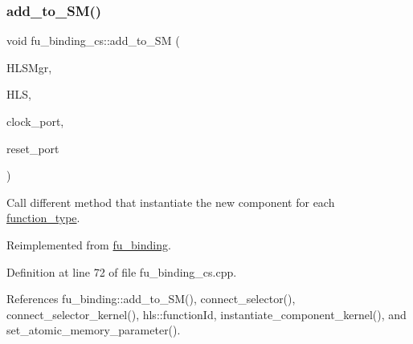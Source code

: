 \subsubsection{\texorpdfstring{add\+\_\+to\+\_\+\+S\+M()}{add\_to\_SM()}}
{\footnotesize\ttfamily void fu\+\_\+binding\+\_\+cs\+::add\+\_\+to\+\_\+\+SM (\begin{DoxyParamCaption}\item[{const \hyperlink{hls__manager_8hpp_acd3842b8589fe52c08fc0b2fcc813bfe}{H\+L\+S\+\_\+manager\+Ref}}]{H\+L\+S\+Mgr,  }\item[{const \hyperlink{hls_8hpp_a75d0c73923d0ddfa28c4843a802c73a7}{hls\+Ref}}]{H\+LS,  }\item[{\hyperlink{structural__objects_8hpp_a8ea5f8cc50ab8f4c31e2751074ff60b2}{structural\+\_\+object\+Ref}}]{clock\+\_\+port,  }\item[{\hyperlink{structural__objects_8hpp_a8ea5f8cc50ab8f4c31e2751074ff60b2}{structural\+\_\+object\+Ref}}]{reset\+\_\+port }\end{DoxyParamCaption})\hspace{0.3cm}{\ttfamily [virtual]}}



Call different method that instantiate the new component for each \hyperlink{structfunction__type}{function\+\_\+type}. 



Reimplemented from \hyperlink{classfu__binding_a1485a3490fff093e44664db54ecdf39a}{fu\+\_\+binding}.



Definition at line 72 of file fu\+\_\+binding\+\_\+cs.\+cpp.



References fu\+\_\+binding\+::add\+\_\+to\+\_\+\+S\+M(), connect\+\_\+selector(), connect\+\_\+selector\+\_\+kernel(), hls\+::function\+Id, instantiate\+\_\+component\+\_\+kernel(), and set\+\_\+atomic\+\_\+memory\+\_\+parameter().


